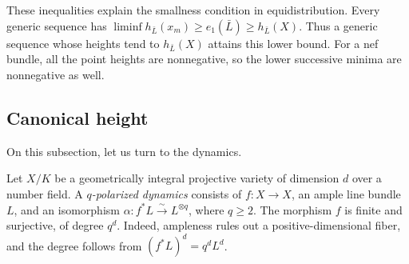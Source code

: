 \begin{latexmathchange}
	These inequalities explain the smallness condition in equidistribution.
	Every generic sequence has $\liminf h_{\bar L}(x_m) \geq e_1(\bar L) \geq h_{\bar L}(X)$.
	Thus a generic sequence whose heights tend to $h_{\bar L}(X)$ attains this lower bound.
	For a nef bundle, all the point heights are nonnegative, so the lower successive minima are nonnegative as well.
\end{latexmathchange}

































\subsection[status=draft,tag=0000000,label=\labelNFM{subsec:canonical-height}]{Canonical height}

\Yang{}

On this subsection, let us turn to the dynamics.

\begin{latexmathchange}
	Let $X/K$ be a geometrically integral projective variety of dimension $d$ over a number field.
	A \emph{$q$-polarized dynamics} consists of $f:X \to X$, an ample line bundle $L$, and an isomorphism $\alpha:f^*L\xrightarrow{ \sim }L^{\otimes q}$, where $q \geq 2$.
	The morphism $f$ is finite and surjective, of degree $q^d$.
	Indeed, ampleness rules out a positive-dimensional fiber, and the degree follows from $(f^*L)^d = q^d L^d$.
\end{latexmathchange}

